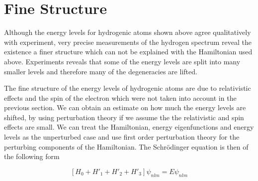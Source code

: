 \documentclass[a4paper]{IEEEtran}
\begin{document}
\section{Fine Structure}
    Although the energy levels for hydrogenic atoms shown above agree qualitatively with
    experiment, very precise measurements of the hydrogen spectrum reveal the existence 
    a finer structure which can not be explained with the Hamiltonian used above.
    Experiments reveals that some of the energy levels are split into many smaller levels
    and therefore many of the degeneracies are lifted.

    The fine structure of the energy levels of hydrogenic atoms are due to relativistic
    effects and the spin of the electron which were not taken into account in the previous
    section. We can obtain an estimate on how much the energy levels are shifted, by 
    using perturbation theory if we assume the the relativistic and spin effects are 
    small. We can treat the Hamiltonian, energy eigenfunctions and energy levels as
    the unperturbed case and use first order perturbation theory for the perturbing
    components of the Hamiltonian. The Schr\"odinger equation is then of the following
    form

    \begin{equation} 
        \left[ H_0 + H'_1 + H'_2 + H'_3 \right] \psi_{nlm} = E \psi_{nlm}
    \end{equation} 
\end{document}
